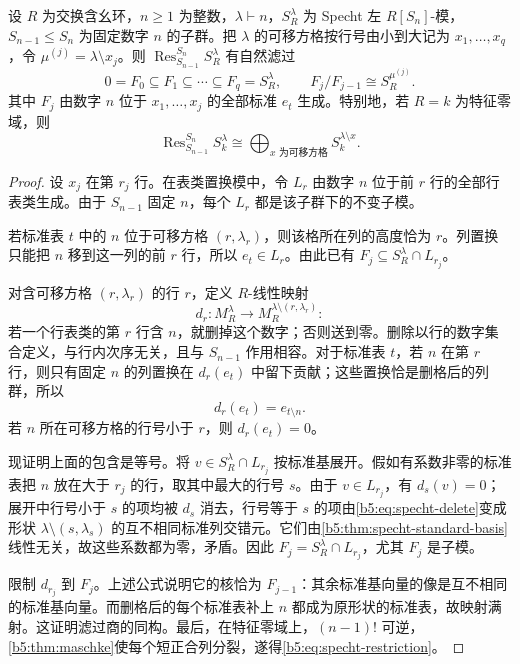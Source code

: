 \begin{theorem}[限制分支]\label{b5:thm:specht-branching}
	设 \(R\) 为交换含幺环，\(n\geq1\) 为整数，\(\lambda\vdash n\)，\(S_R^\lambda\) 为 Specht 左 \(R[S_n]\)-模，\(S_{n-1}\le S_n\) 为固定数字 \(n\) 的子群。把 \(\lambda\) 的可移方格按行号由小到大记为 \(x_1,\ldots,x_q\)，令 \(\mu^{(j)}=\lambda\setminus x_j\)。则 \(\operatorname{Res}_{S_{n-1}}^{S_n}S_R^\lambda\) 有自然滤过
	\[
		0=F_0\subseteq F_1\subseteq\cdots\subseteq F_q=S_R^\lambda, \qquad F_j/F_{j-1}\cong S_R^{\mu^{(j)}}.
	\]
	其中 \(F_j\) 由数字 \(n\) 位于 \(x_1,\ldots,x_j\) 的全部标准 \(e_t\) 生成。特别地，若 \(R=k\) 为特征零域，则
	\begin{equation}\label{b5:eq:specht-restriction}
		\operatorname{Res}_{S_{n-1}}^{S_n}S_k^\lambda \cong\bigoplus_{x\text{ 为可移方格}}S_k^{\lambda\setminus x}.
	\end{equation}
\end{theorem}
\begin{proof}
	设 \(x_j\) 在第 \(r_j\) 行。在表类置换模中，令 \(L_r\) 由数字 \(n\) 位于前 \(r\) 行的全部行表类生成。由于 \(S_{n-1}\) 固定 \(n\)，每个 \(L_r\) 都是该子群下的不变子模。

	若标准表 \(t\) 中的 \(n\) 位于可移方格 \((r,\lambda_r)\)，则该格所在列的高度恰为 \(r\)。列置换只能把 \(n\) 移到这一列的前 \(r\) 行，所以 \(e_t\in L_r\)。由此已有 \(F_j\subseteq S_R^\lambda\cap L_{r_j}\)。

	对含可移方格 \((r,\lambda_r)\) 的行 \(r\)，定义 \(R\)-线性映射
	\[
		d_r:M_R^\lambda\longrightarrow M_R^{\lambda\setminus(r,\lambda_r)}:
	\]
	若一个行表类的第 \(r\) 行含 \(n\)，就删掉这个数字；否则送到零。删除以行的数字集合定义，与行内次序无关，且与 \(S_{n-1}\) 作用相容。对于标准表 \(t\)，若 \(n\) 在第 \(r\) 行，则只有固定 \(n\) 的列置换在 \(d_r(e_t)\) 中留下贡献；这些置换恰是删格后的列群，所以
	\begin{equation}\label{b5:eq:specht-delete}
		d_r(e_t)=e_{t\setminus n}.
	\end{equation}
	若 \(n\) 所在可移方格的行号小于 \(r\)，则 \(d_r(e_t)=0\)。

	现证明上面的包含是等号。将 \(v\in S_R^\lambda\cap L_{r_j}\) 按标准基展开。假如有系数非零的标准表把 \(n\) 放在大于 \(r_j\) 的行，取其中最大的行号 \(s\)。由于 \(v\in L_{r_j}\)，有 \(d_s(v)=0\)；展开中行号小于 \(s\) 的项均被 \(d_s\) 消去，行号等于 \(s\) 的项由\eqref{b5:eq:specht-delete}变成形状 \(\lambda\setminus(s,\lambda_s)\) 的互不相同标准列交错元。它们由\cref{b5:thm:specht-standard-basis}线性无关，故这些系数都为零，矛盾。因此 \(F_j=S_R^\lambda\cap L_{r_j}\)，尤其 \(F_j\) 是子模。

	限制 \(d_{r_j}\) 到 \(F_j\)。上述公式说明它的核恰为 \(F_{j-1}\)：其余标准基向量的像是互不相同的标准基向量。而删格后的每个标准表补上 \(n\) 都成为原形状的标准表，故映射满射。这证明滤过商的同构。最后，在特征零域上，\((n-1)!\) 可逆，\cref{b5:thm:maschke}使每个短正合列分裂，遂得\eqref{b5:eq:specht-restriction}。
\end{proof}

